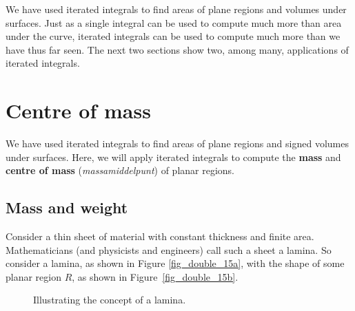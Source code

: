 We have used iterated integrals to find areas of plane regions and volumes under surfaces. Just as a single integral can be used to compute much more than area under the curve, iterated integrals can be used to compute much more than we have thus far seen. The next two sections show two, among many, applications of iterated integrals.

\section{Centre of mass}\label{sec:center_of_mass}

We have used iterated integrals to find areas of plane regions and signed volumes under surfaces. Here, we will  apply iterated integrals to compute the \textbf{mass} and \textbf{centre of mass} (\textit{massamiddelpunt}) of planar regions.

\subsection{Mass and weight}
Consider a thin sheet of material with constant thickness and finite area. Mathematicians (and physicists and engineers) call such a sheet a lamina. So consider a lamina, as shown in Figure \ref{fig_double_15a},  with the shape of some planar region $R$, as shown in Figure~\ref{fig_double_15b}.

\begin{figure}
\centering
\qquad
{}
\caption{Illustrating the concept of a lamina.}
\end{figure}


